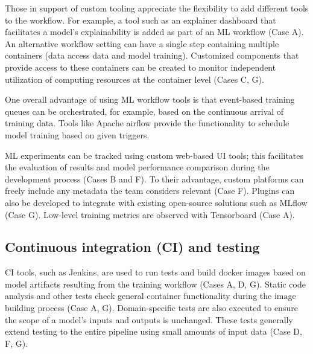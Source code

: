 
Those in support of custom tooling appreciate the flexibility to add different tools to the workflow. For example, a tool such as an explainer dashboard that facilitates a model's explainability is added as part of an ML workflow (Case A). An alternative workflow setting can have a single step containing multiple containers (data access data and model training). Customized components that provide access to these containers can be created to monitor independent utilization of computing resources at the container level (Cases C, G).

One overall advantage of using ML workflow tools is that event-based training queues can be orchestrated, for example, based on the continuous arrival of training data.  Tools like Apache airflow provide the functionality to schedule model training based on given triggers.

ML experiments can be tracked using custom web-based UI tools; this facilitates the evaluation of results and model performance comparison during the development process (Cases B and F). To their advantage, custom platforms can freely include any metadata the team considers relevant (Case F). Plugins can also be developed to integrate with existing open-source solutions such as MLflow (Case G). Low-level training metrics are observed with Tensorboard (Case A).



\subsection{Continuous integration (CI) and testing}

CI tools, such as Jenkins, are used to run tests and build docker images based on model artifacts resulting from the training workflow (Cases A, D, G). Static code analysis and other tests check general container functionality during the image building process (Case A, G). Domain-specific tests are also executed to ensure the scope of a model's inputs and outputs is unchanged. These tests generally extend testing to the entire pipeline using small amounts of input data (Case D, F, G). 


